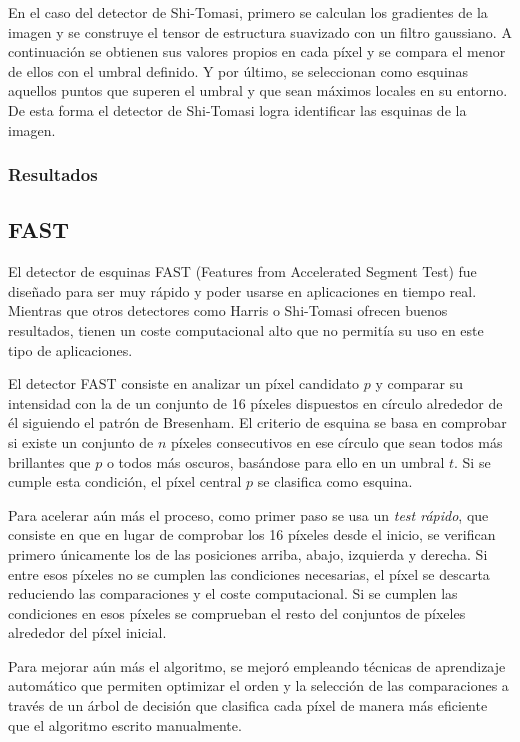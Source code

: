 En el caso del detector de Shi-Tomasi, primero se calculan los gradientes de la imagen y se construye el tensor de estructura suavizado con un filtro gaussiano. A continuación se obtienen sus valores propios en cada píxel y se compara el menor de ellos con el umbral definido. Y por último, se seleccionan como esquinas aquellos puntos que superen el umbral y que sean máximos locales en su entorno. De esta forma el detector de Shi-Tomasi logra identificar las esquinas de la imagen.


\subsubsection{Resultados}


\subsection{FAST}

El detector de esquinas FAST (Features from Accelerated Segment Test) \cite{rosten2006fast} fue diseñado para ser muy rápido y poder usarse en aplicaciones en tiempo real. Mientras que otros detectores como Harris o Shi-Tomasi ofrecen buenos resultados, tienen un coste computacional alto que no permitía su uso en este tipo de aplicaciones.

El detector FAST consiste en analizar un píxel candidato \(p\) y comparar su intensidad con la de un conjunto de 16 píxeles dispuestos en círculo alrededor de él siguiendo el patrón de Bresenham. El criterio de esquina se basa en comprobar si existe un conjunto de \(n\) píxeles consecutivos en ese círculo que sean todos más brillantes que \(p\) o todos más oscuros, basándose para ello en un umbral \(t\). Si se cumple esta condición, el píxel central \(p\) se clasifica como esquina.

Para acelerar aún más el proceso, como primer paso se usa un \emph{test rápido}, que consiste en que en lugar de comprobar los 16 píxeles desde el inicio, se verifican primero únicamente los de las posiciones arriba, abajo, izquierda y derecha. Si entre esos píxeles no se cumplen las condiciones necesarias, el píxel se descarta reduciendo las comparaciones y el coste computacional. Si se cumplen las condiciones en esos píxeles se comprueban el resto del conjuntos de píxeles alrededor del píxel inicial.

Para mejorar aún más el algoritmo, se mejoró empleando técnicas de aprendizaje automático que permiten optimizar el orden y la selección de las comparaciones a través de un árbol de decisión que clasifica cada píxel de manera más eficiente que el algoritmo escrito manualmente.

